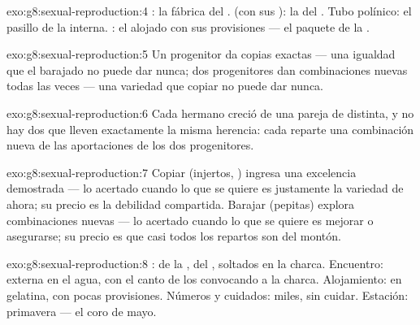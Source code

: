 \begin{solution}{exo:g8:sexual-reproduction:4}
: la fábrica del  .  (con sus ): la
del . Tubo polínico: el pasillo de la  interna.
: el  alojado con sus provisiones --- el paquete 
de la .
\end{solution}

\begin{solution}{exo:g8:sexual-reproduction:5}
Un progenitor da copias exactas --- una igualdad que el barajado no
puede dar nunca; dos progenitores dan combinaciones nuevas todas las
veces --- una variedad que copiar no puede dar nunca.
\end{solution}

\begin{solution}{exo:g8:sexual-reproduction:6}
Cada hermano creció de una pareja de  distinta, y no hay dos
 que lleven exactamente la misma herencia: cada 
reparte una combinación nueva de las aportaciones de los dos
progenitores.
\end{solution}

\begin{solution}{exo:g8:sexual-reproduction:7}
Copiar (injertos, ) ingresa una excelencia demostrada --- lo
acertado cuando lo que se quiere es justamente la variedad de ahora; su
precio es la debilidad compartida. Barajar (pepitas) explora
combinaciones nuevas --- lo acertado cuando lo que se quiere es mejorar
o asegurarse; su precio es que casi todos los repartos son del montón.
\end{solution}

\begin{solution}{exo:g8:sexual-reproduction:8}
:  de la ,  del , soltados en la
charca. Encuentro:  externa en el agua, con el canto de los
 convocando a la charca. Alojamiento:  en gelatina, con
pocas provisiones. Números y cuidados: miles, sin cuidar. Estación:
primavera --- el coro de mayo.
\end{solution}

